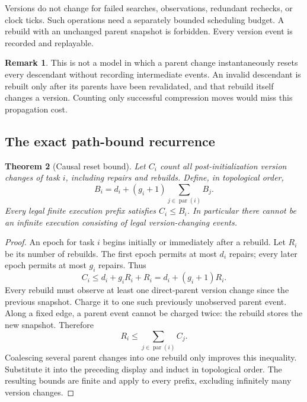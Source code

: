 \documentclass[11pt]{article}
\newtheorem{theorem}{Theorem}[section]
\theoremstyle{definition}
\newtheorem{remark}[theorem]{Remark}
\newcommand{\parents}{\operatorname{par}}
\begin{document}
Versions do not change for failed searches, observations, redundant rechecks, or clock ticks. Such operations need a separately bounded scheduling budget. A rebuild with an unchanged parent snapshot is forbidden. Every version event is recorded and replayable.

\begin{remark}
This is not a model in which a parent change instantaneously resets every descendant without recording intermediate events. An invalid descendant is rebuilt only after its parents have been revalidated, and that rebuild itself changes a version. Counting only successful compression moves would miss this propagation cost.
\end{remark}

\subsection{The exact path-bound recurrence}
\begin{theorem}[Causal reset bound]\label{thm:causal}
Let $C_i$ count all post-initialization version changes of task $i$, including repairs and rebuilds. Define, in topological order,
\begin{equation}\label{eq:recurrence}
 B_i=d_i+(g_i+1)\sum_{j\in\parents(i)}B_j.
\end{equation}
Every legal finite execution prefix satisfies $C_i\leq B_i$. In particular there cannot be an infinite execution consisting of legal version-changing events.
\end{theorem}
\begin{proof}
An epoch for task $i$ begins initially or immediately after a rebuild. Let $R_i$ be its number of rebuilds. The first epoch permits at most $d_i$ repairs; every later epoch permits at most $g_i$ repairs. Thus
\[
 C_i\leq d_i+g_iR_i+R_i=d_i+(g_i+1)R_i.
\]
Every rebuild must observe at least one direct-parent version change since the previous snapshot. Charge it to one such previously unobserved parent event. Along a fixed edge, a parent event cannot be charged twice: the rebuild stores the new snapshot. Therefore
\[
 R_i\leq\sum_{j\in\parents(i)}C_j.
\]
Coalescing several parent changes into one rebuild only improves this inequality. Substitute it into the preceding display and induct in topological order. The resulting bounds are finite and apply to every prefix, excluding infinitely many version changes.
\end{proof}
\end{document}
